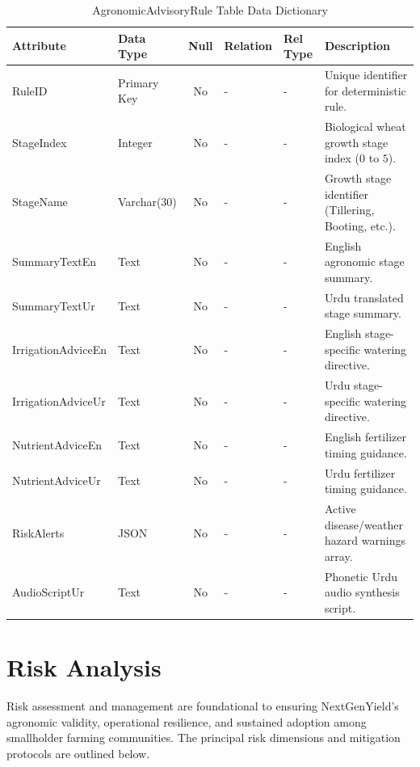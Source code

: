 \documentclass{FastFyp}
\begin{document}
\begin{table}[H]
\footnotesize
\centering
\caption{AgronomicAdvisoryRule Table Data Dictionary}
\label{tab:advisory_table}
\begin{tabular}{|l|l|c|l|l|p{4.5cm}|}
\hline
\textbf{Attribute} & \textbf{Data Type} & \textbf{Null} & \textbf{Relation} & \textbf{Rel Type} & \textbf{Description} \\ \hline
RuleID & Primary Key & No & - & - & Unique identifier for deterministic rule. \\ \hline
StageIndex & Integer & No & - & - & Biological wheat growth stage index ($0$ to $5$). \\ \hline
StageName & Varchar(30) & No & - & - & Growth stage identifier (Tillering, Booting, etc.). \\ \hline
SummaryTextEn & Text & No & - & - & English agronomic stage summary. \\ \hline
SummaryTextUr & Text & No & - & - & Urdu translated stage summary. \\ \hline
IrrigationAdviceEn & Text & No & - & - & English stage-specific watering directive. \\ \hline
IrrigationAdviceUr & Text & No & - & - & Urdu stage-specific watering directive. \\ \hline
NutrientAdviceEn & Text & No & - & - & English fertilizer timing guidance. \\ \hline
NutrientAdviceUr & Text & No & - & - & Urdu fertilizer timing guidance. \\ \hline
RiskAlerts & JSON & No & - & - & Active disease/weather hazard warnings array. \\ \hline
AudioScriptUr & Text & No & - & - & Phonetic Urdu audio synthesis script. \\ \hline
\end{tabular}
\end{table}

\clearpage
\section{Risk Analysis}
Risk assessment and management are foundational to ensuring NextGenYield's agronomic validity, operational resilience, and sustained adoption among smallholder farming communities. The principal risk dimensions and mitigation protocols are outlined below.
\end{document}
